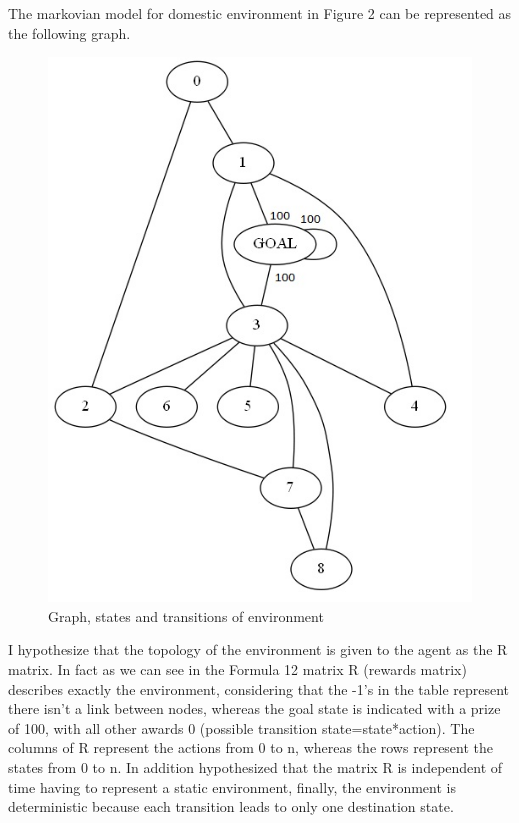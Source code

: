 \documentclass[a4paper]{article}
\begin{document}
The markovian model for domestic environment in Figure 2 can be represented as the following graph.
\begin{figure}[htbp]
\begin{center}
\includegraphics[scale=0.5]{graph.jpg}
\caption{Graph, states and transitions of environment}
\end{center}
\end{figure}

I hypothesize that the topology of the environment is given to the agent as the R matrix. 
In fact as we can see in the Formula 12 matrix R (rewards matrix) describes exactly the environment, considering that the -1's in the table represent there isn't a link between nodes, whereas the goal state is indicated with a prize of 100, with all other awards 0 (possible transition state=state*action).
The columns of R represent the actions from 0 to n, whereas the rows represent the states from 0 to n.
In addition hypothesized that the matrix R is independent of time having to represent a static environment, finally, the environment is deterministic because each transition leads to only one destination state.
\end{document}
